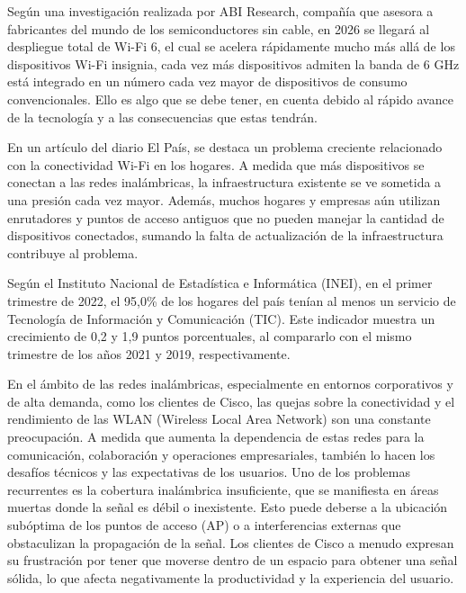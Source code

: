 Según una investigación realizada por ABI Research, compañía que asesora a fabricantes del mundo de los semiconductores sin cable, en 2026 se llegará al despliegue total de Wi-Fi 6, el cual se acelera rápidamente mucho más allá de los dispositivos Wi-Fi insignia, cada vez más dispositivos admiten la banda de 6 GHz está integrado en un número cada vez mayor de dispositivos de consumo convencionales. \cite{ot_zig2020abi} Ello es algo que se debe tener, en cuenta debido al rápido avance de la tecnología y a las consecuencias que estas tendrán.

En un artículo del diario El País, se destaca un problema creciente relacionado con la conectividad Wi-Fi en los hogares. A medida que más dispositivos se conectan a las redes inalámbricas, la infraestructura existente se ve sometida a una presión cada vez mayor. Además, muchos hogares y empresas aún utilizan enrutadores y puntos de acceso antiguos que no pueden manejar la cantidad de dispositivos conectados, sumando la falta de actualización de la infraestructura contribuye al problema. \cite{ot_elpais2023wifi}

Según el Instituto Nacional de Estadística e Informática (INEI), en el primer trimestre de 2022, el 95,0\% de los hogares del país tenían al menos un servicio de Tecnología de Información y Comunicación (TIC). Este indicador muestra un crecimiento de 0,2 y 1,9 puntos porcentuales, al compararlo con el mismo trimestre de los años 2021 y 2019, respectivamente.  \cite{ot_inei2022estati}

En el ámbito de las redes inalámbricas, especialmente en entornos corporativos y de alta demanda, como los clientes de Cisco, las quejas sobre la conectividad y el rendimiento de las WLAN (Wireless Local Area Network) son una constante preocupación. A medida que aumenta la dependencia de estas redes para la comunicación, colaboración y operaciones empresariales, también lo hacen los desafíos técnicos y las expectativas de los usuarios. Uno de los problemas recurrentes es la cobertura inalámbrica insuficiente, que se manifiesta en áreas muertas donde la señal es débil o inexistente. Esto puede deberse a la ubicación subóptima de los puntos de acceso (AP) o a interferencias externas que obstaculizan la propagación de la señal. Los clientes de Cisco a menudo expresan su frustración por tener que moverse dentro de un espacio para obtener una señal sólida, lo que afecta negativamente la productividad y la experiencia del usuario.  \cite{ot_cisco2022ap}


